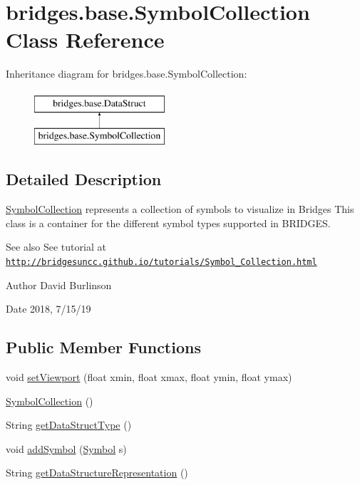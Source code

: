 \hypertarget{classbridges_1_1base_1_1_symbol_collection}{}\section{bridges.\+base.\+Symbol\+Collection Class Reference}
\label{classbridges_1_1base_1_1_symbol_collection}
Inheritance diagram for bridges.\+base.\+Symbol\+Collection\+:\begin{figure}[H]
\begin{center}
\leavevmode
\includegraphics[height=2.000000cm]{classbridges_1_1base_1_1_symbol_collection}
\end{center}
\end{figure}


\subsection{Detailed Description}
\hyperlink{classbridges_1_1base_1_1_symbol_collection}{Symbol\+Collection} represents a collection of symbols to visualize in Bridges This class is a container for the different symbol types supported in B\+R\+I\+D\+G\+ES. 

\begin{DoxySeeAlso}{See also}
See tutorial at \href{http://bridgesuncc.github.io/tutorials/Symbol_Collection.html}{\tt http\+://bridgesuncc.\+github.\+io/tutorials/\+Symbol\+\_\+\+Collection.\+html}
\end{DoxySeeAlso}
\begin{DoxyAuthor}{Author}
David Burlinson 
\end{DoxyAuthor}
\begin{DoxyDate}{Date}
2018, 7/15/19 
\end{DoxyDate}
\subsection*{Public Member Functions}
\begin{DoxyCompactItemize}
\item 
void \hyperlink{classbridges_1_1base_1_1_symbol_collection_a59af7625aad721a9f14ac1fec22c8bde}{set\+Viewport} (float xmin, float xmax, float ymin, float ymax)
\item 
\hyperlink{classbridges_1_1base_1_1_symbol_collection_a8959dab963ce54f56560c6c27a3a3de5}{Symbol\+Collection} ()
\item 
String \hyperlink{classbridges_1_1base_1_1_symbol_collection_afbc928d2e6818edec96d10f52feebacb}{get\+Data\+Struct\+Type} ()
\item 
void \hyperlink{classbridges_1_1base_1_1_symbol_collection_a8e934c53b78b05a7e982f3ff2362adea}{add\+Symbol} (\hyperlink{classbridges_1_1base_1_1_symbol}{Symbol} s)
\item 
String \hyperlink{classbridges_1_1base_1_1_symbol_collection_a706ad8a7bcf12c194403ac3281c73674}{get\+Data\+Structure\+Representation} ()
\end{DoxyCompactItemize}
